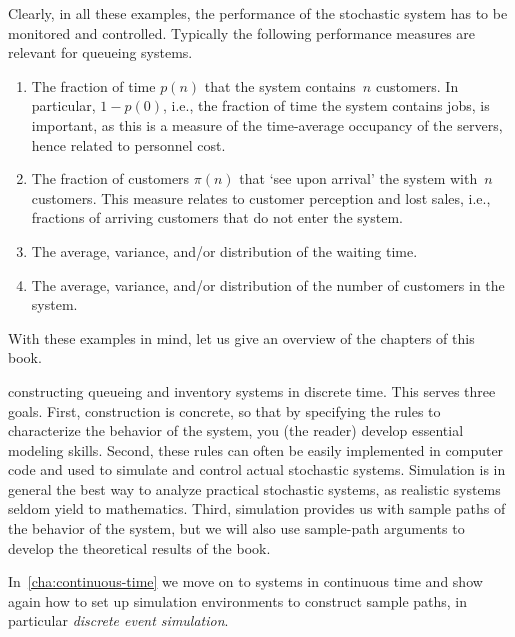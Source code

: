 \documentclass[stochastic-or.tex]{subfiles}
\begin{document}
Clearly, in all these examples, the performance of the stochastic system has to be monitored and controlled.
Typically the following performance measures are relevant for queueing systems.
\begin{enumerate}
\item The fraction of time $p(n)$ that the system contains~$n$ customers.
 In particular, $1-p(0)$, i.e., the fraction of time the system contains jobs, is important, as this is a measure of the time-average occupancy of the servers, hence related to personnel cost.
\item The fraction of customers $\pi(n)$ that `see upon arrival' the system with~$n$ customers.
  This measure relates to customer perception and lost sales, i.e., fractions of arriving customers that do not enter the system.
\item The average, variance, and/or distribution of the waiting time.
\item The average, variance, and/or distribution of the number of customers in the system.\
\end{enumerate}


With these examples in mind, let us give an overview of the chapters of this book.

 constructing queueing and inventory systems in discrete time.
This serves three goals.
First, construction is concrete, so that by specifying the rules to characterize the behavior of the system, you (the reader) develop essential modeling skills.
Second, these rules can often be easily implemented in computer code and used to simulate and control actual stochastic systems.
Simulation is in general the best way to analyze practical stochastic systems, as realistic systems seldom yield to mathematics.
Third, simulation provides us with sample paths of the behavior of the system, but we will also use sample-path arguments to develop the theoretical results of  the book.

In~\cref{cha:continuous-time} we move on to systems in continuous time and show again how to set up simulation environments to construct sample paths, in particular  \emph{discrete event simulation}.
\end{document}
